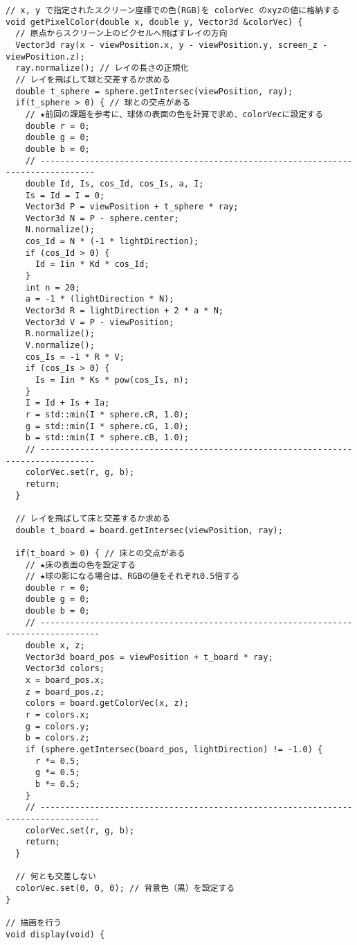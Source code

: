 \documentclass{scrartcl}
\begin{document}
\begin{verbatim}
// x, y で指定されたスクリーン座標での色(RGB)を colorVec のxyzの値に格納する
void getPixelColor(double x, double y, Vector3d &colorVec) {
  // 原点からスクリーン上のピクセルへ飛ばすレイの方向
  Vector3d ray(x - viewPosition.x, y - viewPosition.y, screen_z - viewPosition.z);
  ray.normalize(); // レイの長さの正規化
  // レイを飛ばして球と交差するか求める
  double t_sphere = sphere.getIntersec(viewPosition, ray);
  if(t_sphere > 0) { // 球との交点がある
    // ★前回の課題を参考に、球体の表面の色を計算で求め、colorVecに設定する
    double r = 0;
    double g = 0;
    double b = 0;
    // ---------------------------------------------------------------------------------
    double Id, Is, cos_Id, cos_Is, a, I;
    Is = Id = I = 0;
    Vector3d P = viewPosition + t_sphere * ray;
    Vector3d N = P - sphere.center;
    N.normalize();
    cos_Id = N * (-1 * lightDirection);
    if (cos_Id > 0) {
      Id = Iin * Kd * cos_Id;
    }
    int n = 20;
    a = -1 * (lightDirection * N);
    Vector3d R = lightDirection + 2 * a * N;
    Vector3d V = P - viewPosition;
    R.normalize();
    V.normalize();
    cos_Is = -1 * R * V;
    if (cos_Is > 0) {
      Is = Iin * Ks * pow(cos_Is, n);
    }
    I = Id + Is + Ia;
    r = std::min(I * sphere.cR, 1.0);
    g = std::min(I * sphere.cG, 1.0);
    b = std::min(I * sphere.cB, 1.0);
    // ---------------------------------------------------------------------------------
    colorVec.set(r, g, b);
    return;
  }

  // レイを飛ばして床と交差するか求める
  double t_board = board.getIntersec(viewPosition, ray);

  if(t_board > 0) { // 床との交点がある
    // ★床の表面の色を設定する
    // ★球の影になる場合は、RGBの値をそれぞれ0.5倍する
    double r = 0;
    double g = 0;
    double b = 0;
    // ----------------------------------------------------------------------------------
    double x, z;
    Vector3d board_pos = viewPosition + t_board * ray;
    Vector3d colors;
    x = board_pos.x;
    z = board_pos.z;
    colors = board.getColorVec(x, z);
    r = colors.x;
    g = colors.y;
    b = colors.z;
    if (sphere.getIntersec(board_pos, lightDirection) != -1.0) {
      r *= 0.5;
      g *= 0.5;
      b *= 0.5;
    } 
    // ----------------------------------------------------------------------------------
    colorVec.set(r, g, b);
    return;
  }

  // 何とも交差しない
  colorVec.set(0, 0, 0); // 背景色（黒）を設定する
}

// 描画を行う
void display(void) {


\end{verbatim}
\end{document}
